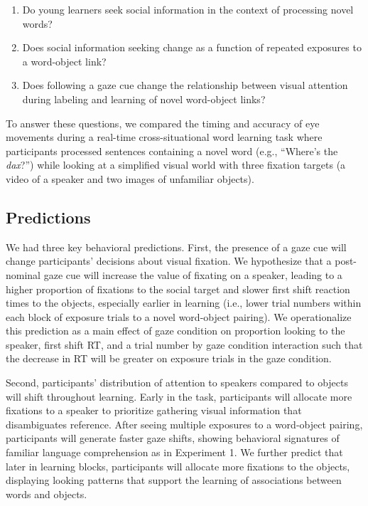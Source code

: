 \documentclass[man,floatsintext]{apa6}
\providecommand{\tightlist}{%
  \setlength{\itemsep}{0pt}\setlength{\parskip}{0pt}}
\begin{document}
\begin{enumerate}
\def\labelenumi{\arabic{enumi}.}
\tightlist
\item
  Do young learners seek social information in the context of processing
  novel words?\\
\item
  Does social information seeking change as a function of repeated
  exposures to a word-object link?
\item
  Does following a gaze cue change the relationship between visual
  attention during labeling and learning of novel word-object links?
\end{enumerate}

To answer these questions, we compared the timing and accuracy of eye
movements during a real-time cross-situational word learning task where
participants processed sentences containing a novel word (e.g.,
\enquote{Where's the \emph{dax}?}) while looking at a simplified visual
world with three fixation targets (a video of a speaker and two images
of unfamiliar objects).

\subsection{Predictions}\label{predictions}

We had three key behavioral predictions. First, the presence of a gaze
cue will change participants' decisions about visual fixation. We
hypothesize that a post-nominal gaze cue will increase the value of
fixating on a speaker, leading to a higher proportion of fixations to
the social target and slower first shift reaction times to the objects,
especially earlier in learning (i.e., lower trial numbers within each
block of exposure trials to a novel word-object pairing). We
operationalize this prediction as a main effect of gaze condition on
proportion looking to the speaker, first shift RT, and a trial number by
gaze condition interaction such that the decrease in RT will be greater
on exposure trials in the gaze condition.

Second, participants' distribution of attention to speakers compared to
objects will shift throughout learning. Early in the task, participants
will allocate more fixations to a speaker to prioritize gathering visual
information that disambiguates reference. After seeing multiple
exposures to a word-object pairing, participants will generate faster
gaze shifts, showing behavioral signatures of familiar language
comprehension as in Experiment 1. We further predict that later in
learning blocks, participants will allocate more fixations to the
objects, displaying looking patterns that support the learning of
associations between words and objects.
\end{document}
